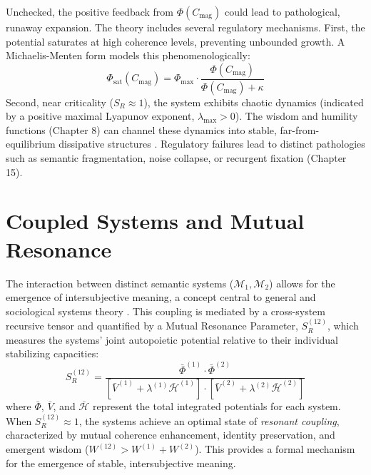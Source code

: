 Unchecked, the positive feedback from \(\Phi(C_{\mathrm{mag}})\) could lead to pathological, runaway expansion. The theory includes several regulatory mechanisms. First, the potential saturates at high coherence levels, preventing unbounded growth. A Michaelis-Menten form \autocite{MichaelisMenten1913} models this phenomenologically:
\begin{equation}
\Phi_{\text{sat}}(C_{\mathrm{mag}}) = \Phi_{\text{max}} \cdot \frac{\Phi(C_{\mathrm{mag}})}{\Phi(C_{\mathrm{mag}}) + \kappa}
\end{equation}
Second, near criticality (\(S_R \approx 1\)), the system exhibits chaotic dynamics (indicated by a positive maximal Lyapunov exponent, \(\lambda_{\text{max}} > 0\)). The wisdom and humility functions (Chapter 8) can channel these dynamics into stable, far-from-equilibrium dissipative structures \autocite{PrigogineStengers1984}. Regulatory failures lead to distinct pathologies such as semantic fragmentation, noise collapse, or recurgent fixation (Chapter 15).

\section{Coupled Systems and Mutual Resonance}

The interaction between distinct semantic systems (\(\mathcal{M}_1, \mathcal{M}_2\)) allows for the emergence of intersubjective meaning, a concept central to general and sociological systems theory \autocite{vonBertalanffy1968, Luhmann1995}. This coupling is mediated by a cross-system recursive tensor and quantified by a Mutual Resonance Parameter, \(S_R^{(12)}\), which measures the systems' joint autopoietic potential relative to their individual stabilizing capacities:
\begin{equation}
S_R^{(12)} = \frac{\bar{\Phi}^{(1)} \cdot \bar{\Phi}^{(2)}}{[\bar{V}^{(1)} + \lambda^{(1)} \bar{\mathcal{H}}^{(1)}] \cdot [\bar{V}^{(2)} + \lambda^{(2)} \bar{\mathcal{H}}^{(2)}]}
\end{equation}
where \(\bar{\Phi}\), \(\bar{V}\), and \(\bar{\mathcal{H}}\) represent the total integrated potentials for each system. When \(S_R^{(12)} \approx 1\), the systems achieve an optimal state of \textit{resonant coupling}, characterized by mutual coherence enhancement, identity preservation, and emergent wisdom (\(W^{(12)} > W^{(1)} + W^{(2)}\)). This provides a formal mechanism for the emergence of stable, intersubjective meaning.